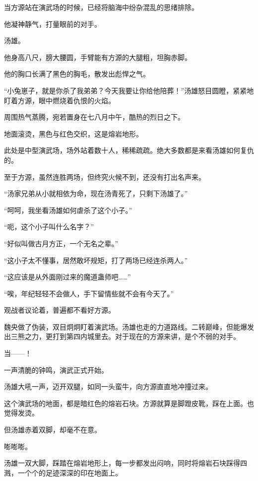 
\begin{this_body}

当方源站在演武场的时候，已经将脑海中纷杂混乱的思绪排除。

他凝神静气，打量眼前的对手。

汤雄。

他身高八尺，膀大腰圆，手臂能有方源的大腿粗，坦胸赤脚。

他的胸口长满了黑色的胸毛，散发出彪悍之气。

“小兔崽子，就是你杀了我弟弟？今天我要让你给他陪葬！”汤雄怒目圆瞪，紧紧地盯着方源，眼中燃烧着仇恨的火焰。

周围热气蒸腾，宛若置身在七八月中午，酷热的烈日之下。

地面滚烫，黑色与红色交织，这是熔岩地形。

此处是中型演武场，场外站着数十人，稀稀疏疏。绝大多数都是来看汤雄如何复仇的。

至于方源，虽然连胜两场，但终究火候不到，还没有打出名声来。

“汤家兄弟从小就相依为命，现在汤青死了，只剩下汤雄了。”

“呵呵，我坐看汤雄如何虐杀了这个小子。”

“呃，这个小子叫什么名字？”

“好似叫做古月方正，一个无名之辈。”

“这小子太不懂事，居然敢坏规矩，打了两场已经连杀两人。”

“这应该是从外面刚过来的魔道蛊师吧……”

“唉，年纪轻轻不会做人，手下留情些就不会有今天了。”

观战者议论着，普遍都不看好方源。

魏央做了伪装，双目炯炯盯着演武场。汤雄也走的力道路线。二转巅峰，但能爆发出三熊之力，更打到第四内城里去。对于现在的方源来讲，是个不弱的对手。

当——！

一声清脆的钟鸣，演武正式开始。

汤雄大吼一声，迈开双腿，如同一头蛮牛，向方源直直地冲撞过来。

这个演武场的地面，都是暗红色的熔岩石块。方源就算是脚蹬皮靴，踩在上面。也觉得发烫。

但汤雄赤着双脚，却毫不在意。

嘭嘭嘭。

汤雄一双大脚，踩踏在熔岩地形上，每一步都发出闷响，同时将熔岩石块踩得四溅，一个个的足迹深深的印在地面上。


\end{this_body}
